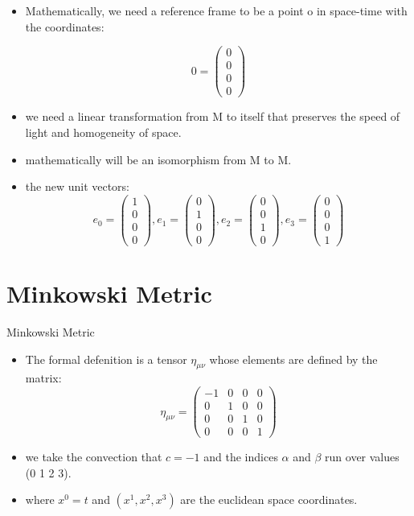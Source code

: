 \documentclass{beamer}
\begin{document}
\begin{frame}
\begin{itemize}
\item Mathematically, we need a reference frame to be a point o in space-time with the coordinates:
\begin{center}
$$
0=\begin{pmatrix}
0\\
0\\
0\\
0
\end{pmatrix}
$$
\end{center}

\item we
need a linear transformation from M to itself that preserves the speed of light and homogeneity of space.
\item mathematically will be an isomorphism from M to M.
\item the new unit vectors:
$$
e_0=\begin{pmatrix}
1\\
0\\
0\\
0
\end{pmatrix}
,e_1=\begin{pmatrix}
0\\
1\\
0\\
0
\end{pmatrix}
,e_2=\begin{pmatrix}
0\\
0\\
1\\
0
\end{pmatrix}
,e_3=\begin{pmatrix}
0\\
0\\
0\\
1
\end{pmatrix}
$$
\end{itemize}
\end{frame}

 \section{Minkowski Metric}
 \begin{frame}{Minkowski Metric}
 \begin{itemize}
  
 \item The formal defenition is a tensor $\eta_{\mu \nu}$ whose elements are defined by the matrix:
\[
\eta_{\mu \nu}=\begin{pmatrix}
-1&0&0&0\\
0&1&0&0\\
0&0&1&0\\
0&0&0&1
\end{pmatrix} 
\]
\item we take the convection that $c=-1$ and the indices $\alpha$ and $\beta$ run over values (0 1 2 3).
\item where $x^0=t$ and $(x^1,x^2,x^3)$ are the euclidean space coordinates.

 \end{itemize}
 \end{frame}
 
\end{document}
